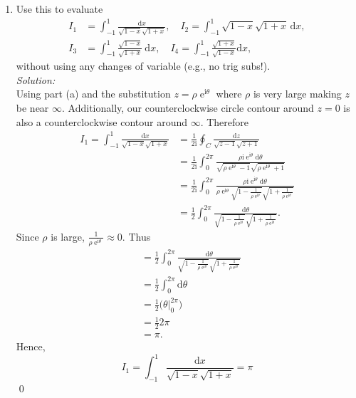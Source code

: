\documentclass[10pt]{amsart}
\newcommand{\D}{\mathrm{d}}
\newcommand{\I}{\mathrm{i}}
\DeclareMathOperator{\E}{e}
\theoremstyle{nonumberplain}
\begin{document}
\begin{enumerate}[label={\bf {\arabic*}:}]
\begin{enumerate}
\item Use this to evaluate
\begin{align*}
	I_1 &= \int_{-1}^1 \frac{\D x}{\sqrt{1 -x} \sqrt{1+x}}, \quad
	I_2 = \int_{-1}^1 \sqrt{1 -x} \sqrt{1 + x}\, \D x, \\
	I_3 &= \int_{-1}^1 \frac{\sqrt{1 -x}}{ \sqrt{1 + x}}\ \D x,
	\quad   I_4 = \int_{-1}^1 \frac{\sqrt{1  +x}}{ \sqrt{1 - x}} \D x,
\end{align*}
without using any changes of variable (e.g., no trig subs!).\\

\noindent
\textit{Solution:} \\
Using part (a) and the substitution $z = \rho \E^{\I \theta}$ where $\rho$ is very large making $z$ be near $\infty$.
Additionally, our counterclockwise circle contour around $z=0$ is also a counterclockwise contour around $\infty$.
Therefore
\begin{align*}
I_1 = \int_{-1}^1 \frac{\D x}{\sqrt{1 -x} \sqrt{1+x}}
	&= \frac{1}{2\I} \oint_C \frac{\D z}{\sqrt{z -1} \sqrt{z + 1}} \\
	&= \frac{1}{2\I} \int_0^{2\pi} \frac {\rho \I \E^{\I \theta} \D \theta}{\sqrt{\rho \E^{\I \theta} -1} \sqrt{\rho \E^{\I \theta} + 1}} \\
	&= \frac{1}{2\I} \int_0^{2\pi} \frac {\rho \I \E^{\I \theta} \D \theta}{\rho \E^{\I \theta} \sqrt{1 - \frac 1{\rho \E^{\I \theta}}} \sqrt{1 + \frac 1{\rho \E^{\I \theta}}}} \\
	&= \frac{1}{2} \int_0^{2\pi} \frac { \D \theta}{\sqrt{1 - \frac 1{\rho \E^{\I \theta}}} \sqrt{1 + \frac 1{\rho \E^{\I \theta}}}}.
\end{align*}
Since $\rho$ is large, $\frac 1{\rho \E^{\I \theta}} \approx 0$.
Thus
\begin{align*}
	&= \frac{1}{2} \int_0^{2\pi} \frac { \D \theta}{\sqrt{1 - \frac 1{\rho \E^{\I \theta}}} \sqrt{1 + \frac 1{\rho \E^{\I \theta}}}} \\
	&= \frac 1 2 \int_0^{2\pi} \D \theta \\
	&= \frac 1 2 \Big( \theta \big|_0^{2\pi} \Big) \\
	&= \frac 1 2 2 \pi \\
	&= \pi.
\end{align*} 
Hence,
$$
I_1 = \int_{-1}^1 \frac{\D x}{\sqrt{1 -x} \sqrt{1+x}} = \pi
$$ \qed \\


\end{enumerate}
\end{enumerate}
\end{document}
